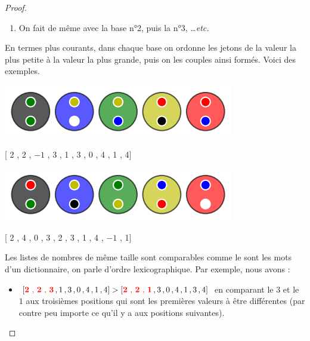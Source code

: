 \begin{proof}
\begin{enumerate}
        \item On fait de même avec la base n°2, puis la n°3, \dots \textit{etc.}
    \end{enumerate}

    En termes plus courants, dans chaque base on ordonne les jetons de la valeur la plus petite à la valeur la plus grande, puis on  les couples  ainsi formés. Voici des exemples.

    \vspace{-0.4em}
    \begin{center}   %
        \includegraphics[scale= 0.45]{content/algo_bubble/modelization/example_a.png}

        [{\color{black} 2 , 2} , {\color{blue} $-1$ , 3} , {\color{ForestGreen} 1 , 3} , {\color{Goldenrod} 0 , 4} , {\color{red} 1 , 4}]


        \medskip     %

        \includegraphics[scale= 0.45]{content/algo_bubble/modelization/example_b.png}

        [{\color{black} 2 , 4} , {\color{blue} 0 , 3} , {\color{ForestGreen} 2 , 3} , {\color{Goldenrod} 1 , 4} , {\color{red} $-1$ , 1}]
    \end{center}

    Les listes de nombres de même taille sont comparables comme le sont les mots d'un dictionnaire, on parle d'ordre lexicographique. Par exemple, nous avons :

    \medskip

    \begin{itemize}
        \item[\textbullet] $[\text{\color{red} \textbf{2} , \textbf{2} , \textbf{3}} \, , 1 \, , 3 \, , 0 \, , 4 \, , 1 \, , 4] > [\text{\color{red} \textbf{2} , \textbf{2} , \textbf{1}} \, , 3 \, , 0 \, , 4 \, , 1 \, , 3 \, , 4]$
        en comparant le $3$ et le $1$ aux troisièmes positions qui sont les premières valeurs à être différentes (par contre peu importe ce qu'il y a aux positions suivantes).


\end{itemize}
\end{proof}
